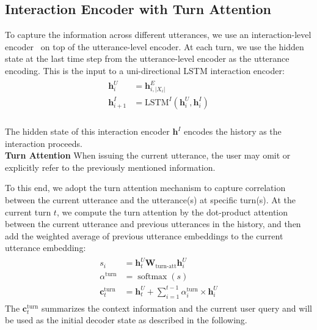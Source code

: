 \documentclass[11pt,a4paper]{article}
\newcommand{\newvec}[1]{\mathbf{#1}}
\DeclareMathOperator*{\softmax}{softmax}
\newcommand{\hide}[1]{}
\begin{document}
\subsection{Interaction Encoder with Turn Attention}
\label{sec:turn-attention}
To capture the information across different utterances, we use an interaction-level encoder~\cite{suhr2018learning} on top of
the utterance-level encoder.
At each turn, we use the hidden state at the last time step from the utterance-level encoder as the utterance encoding.
This is the input to a uni-directional LSTM interaction encoder:
\begin{align*}
\begin{split}
    \newvec{h}^{U}_{i}   & = \newvec{h}^{E}_{i,|X_i|} \\
    \newvec{h}^{I}_{i+1} & = \text{LSTM}^{I}(\newvec{h}^{U}_{i}, \newvec{h}^{I}_{i}) \\
\end{split}
\end{align*}

The hidden state of this interaction encoder $\newvec{h}^{I}$ encodes the history as the interaction proceeds.
\\\noindent
\textbf{Turn Attention}
When issuing the current utterance, the user may omit or explicitly refer to the previously mentioned information.
\hide{
This requires the model to capture the relationships between the current utterance and the context history.
}
To this end, we adopt the turn attention mechanism to capture correlation between the current utterance and the utterance(s) at specific turn(s).
At the current turn $t$, we compute the turn attention by the dot-product attention between the current utterance and previous utterances in the history, and then add the weighted average of previous utterance embeddings to the current utterance embedding:
\begin{align}
\label{eq:turn_att}
\begin{split}
s_{i}                         & = \newvec{h}^{U}_{t}\newvec{W}_{\text{turn-att}}\newvec{h}^{U}_{i} \\
\alpha^{\text{turn}}          & = \softmax(s)  \\
\newvec{c}_{t}^{\text{turn}}  & = \newvec{h}^{U}_{t} + \sum_{i=1}^{t-1} \alpha_{i}^{\text{turn}} \times \newvec{h}^{U}_{i}
\end{split}
\end{align}
The $\newvec{c}_{t}^{\text{turn}}$ summarizes the context information and the current user query and will be used as the initial decoder state as described in the following.
\end{document}

